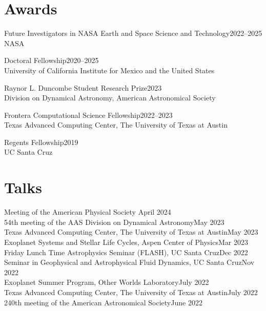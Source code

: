 \documentclass[12pt]{article}
\begin{document}
\section*{Awards}
Future Investigators in NASA Earth and Space Science and Technology\hfill 2022--2025\\
NASA

Doctoral Fellowship\hfill2020--2025\\
University of California Institute for Mexico and the United States

Raynor L. Duncombe Student Research Prize\hfill2023\\
Division on Dynamical Astronomy, American Astronomical Society

Frontera Computational Science Fellowship\hfill 2022--2023\\
Texas Advanced Computing Center, The University of Texas at Austin

Regents Fellowship\hfill 2019\\
UC Santa Cruz

\section*{Talks}
Meeting of the American Physical Society \hfill April 2024\\
54th meeting of the AAS Division on Dynamical Astronomy\hfill May 2023\\
Texas Advanced Computing Center, The University of Texas at Austin\hfill May 2023\\
Exoplanet Systems and Stellar Life Cycles, Aspen Center of Physics\hfill Mar 2023\\
Friday Lunch Time Astrophysics Seminar (FLASH), UC Santa Cruz\hfill Dec 2022\\
Seminar in Geophysical and Astrophysical Fluid Dynamics, UC Santa Cruz\hfill Nov 2022\\
Exoplanet Summer Program, Other Worlds Laboratory\hfill July 2022\\
Texas Advanced Computing Center, The University of Texas at Austin\hfill July 2022\\
240th meeting of the American Astronomical Society\hfill June 2022

\end{document}
